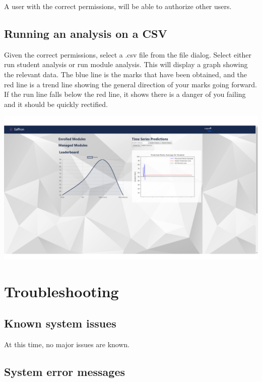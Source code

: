 \documentclass[a4paper,12pt]{article}
\begin{document}
        A user with the correct permissions, will be able to authorize other users.
        
        \subsection{Running an analysis on a CSV}
        
        Given the correct permissions, select a .csv file from the file dialog. Select either run student analysis or run module analysis. This will display a graph showing the relevant data. The blue line is the marks that have been obtained, and the red line is a trend line showing the general direction of your marks going forward. If the run line falls below the red line, it shows there is a danger of you failing and it should be quickly rectified.
        
        \includegraphics[width=1\textwidth]{../images/screens/student-analysis.PNG}\\[1.0cm]
        
    \pagebreak
     
    \section{Troubleshooting}
    
	    \subsection{Known system issues}
	    
	    At this time, no major issues are known.
	    
	    \subsection{System error messages}
	    
\end{document}
